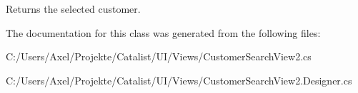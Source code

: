 Returns the selected customer. 



The documentation for this class was generated from the following files\+:\begin{DoxyCompactItemize}
\item 
C\+:/\+Users/\+Axel/\+Projekte/\+Catalist/\+U\+I/\+Views/Customer\+Search\+View2.\+cs\item 
C\+:/\+Users/\+Axel/\+Projekte/\+Catalist/\+U\+I/\+Views/Customer\+Search\+View2.\+Designer.\+cs\end{DoxyCompactItemize}
